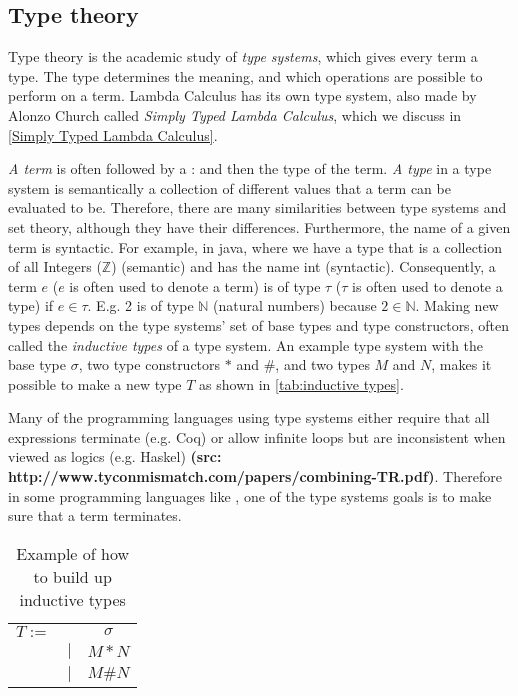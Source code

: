 \subsection{Type theory}
\label{type theory}
Type theory is the academic study of \emph{type systems}, which gives every term a type. The type determines the meaning, and which operations are possible to perform on a term. Lambda Calculus has its own type system, also made by Alonzo Church called \emph{Simply Typed Lambda Calculus}, which we discuss in \autoref{Simply Typed Lambda Calculus}.

\para
\emph{A term} is often followed by a : and then the type of the term. \emph{A type} in a type system is semantically a collection of different values that a term can be evaluated to be. Therefore, there are many similarities between type systems and set theory, although they have their differences. Furthermore, the name of a given term is syntactic. For example, in java, where we have a type that is a collection of all Integers ($\mathbb{Z}$) (semantic) and has the name int (syntactic). Consequently, a term $e$ ($e$ is often used to denote a term) is of type $\tau$ ($\tau$ is often used to denote a type) if $e \in \tau$. E.g. 2 is of type $\mathbb{N}$ (natural numbers) because $2 \in \mathbb{N}$. Making new types depends on the type systems' set of base types and type constructors, often called the \emph{inductive types} of a type system. An example type system with the base type $\sigma$, two type constructors $*$ and $\#$, and two types $M$ and $N$, makes it possible to make a new type $T$ as shown in \autoref{tab:inductive types}. 

\para
Many of the programming languages using type systems either require that all expressions terminate (e.g. Coq) or allow infinite loops but are inconsistent when viewed as logics (e.g. Haskel) \textbf{(src: http://www.tyconmismatch.com/papers/combining-TR.pdf)}.
Therefore in some programming languages like , one of the type systems goals is to make sure that a term terminates. 

\begin{table}[]
    \centering
    \begin{tabular}{c c c}
         $T :=$&  & $\sigma$\\
         & $|$ & $M * N$ \\
         & $|$ & $M \# N$ \\
    \end{tabular}
    \caption{Example of how to build up inductive types}
    \label{tab:inductive types}
\end{table}


